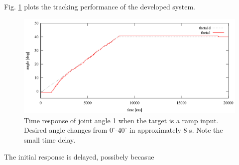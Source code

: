 \documentclass{llncs}
\begin{document}
Fig. \ref{fig:angle_tracking} plots the tracking performance of the developed system.
\begin{figure}[tb]
	\centering
	\includegraphics[width=.70\textwidth]{./figure/plot/0208_3_0-20.pdf}
	\caption{Time response of joint angle 1 when the target is a ramp input. Desired angle changes from $0^{\circ}$-$40^{\circ}$ in approximately 8 s. Note the small time delay.}
	\label{fig:angle_tracking}
\end{figure}
The initial response is delayed, possibely becasue
\end{document}
